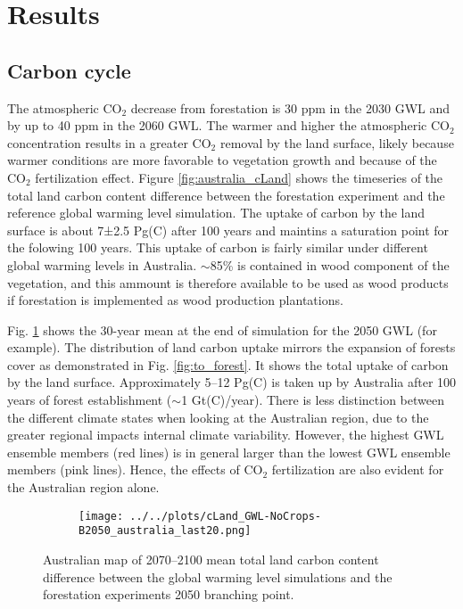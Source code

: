 \documentclass[]{article}
\begin{document}
\section{Results}

\subsection{Carbon cycle}

The atmospheric CO$_2$ decrease from forestation is 30 ppm in the 2030 GWL and by up to 40 ppm in the 2060 GWL.
The warmer and higher the atmospheric CO$_2$ concentration results in a greater CO$_2$ removal by the land surface, likely because warmer conditions are more favorable to vegetation growth and because of the CO$_2$ fertilization effect.
Figure \ref{fig:australia_cLand} shows the timeseries of the total land carbon content difference between the forestation experiment and the reference global warming level simulation.
The uptake of carbon by the land surface is about 7±2.5 Pg(C) after 100 years and maintins a saturation point for the folowing 100 years.
This uptake of carbon is fairly similar under different global warming levels in Australia.
$\sim$85\% is contained in wood component of the vegetation, and this ammount is therefore available to be used as wood products if forestation is implemented as wood production plantations.

Fig. \ref{fig:aus_map_cLand} shows the 30-year mean at the end of simulation for the 2050 GWL (for example).
The distribution of land carbon uptake mirrors the expansion of forests cover as demonstrated in Fig. \ref{fig:to_forest}.
It shows the total uptake of carbon by the land surface.
Approximately 5–12 Pg(C) is taken up by Australia after 100 years of forest establishment ($\sim$1 Gt(C)/year).
There is less distinction between the different climate states when looking at the Australian region, due to the greater regional impacts internal climate variability.
However, the highest GWL ensemble members (red lines) is in general larger than the lowest GWL ensemble members (pink lines).
Hence, the effects of CO$_2$ fertilization are also evident for the Australian region alone.

\begin{figure}[H]
    \centering
    \begin{subfigure}[b]{\linewidth}
        \texttt{[image: ../../plots/cLand\_GWL-NoCrops-B2050\_australia\_last20.png]}
    \end{subfigure}
    \caption{Australian map of 2070--2100 mean total land carbon content difference between the global warming level simulations and the forestation experiments 2050 branching point.}
    \label{fig:aus_map_cLand}
\end{figure}
\end{document}

